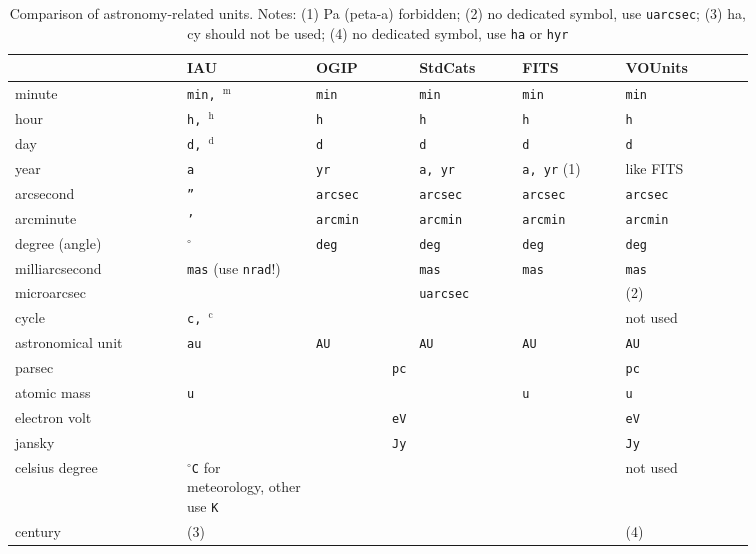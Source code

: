 \documentclass[11pt,notitlepage,onecolumn]{ivoa}
\newcommand{\unit}[1]{\texttt{\small\color{orange}#1}}
\begin{document}
\begin{table}[ht]
\begin{tabular}{|L{0.2\linewidth}|L{0.15\linewidth}|L{0.12\linewidth}|L{0.12\linewidth}|L{0.12\linewidth}|L{0.15\linewidth}|}
\hline
    & IAU & OGIP  & StdCats & FITS  & VOUnits\\\hline
    minute & \unit{min, $^\mathrm{m}$} & \unit{min} & \unit{min} & \unit{min} & \unit{min}\\\hline
    hour & \unit{h, $^\mathrm{h}$} & \unit{h} & \unit{h} & \unit{h} & \unit{h}\\\hline
    day & \unit{d, $^\mathrm{d}$} & \unit{d} & \unit{d} & \unit{d} & \unit{d}\\\hline
    year & \unit{a} & \unit{yr} & \unit{a, yr} & \unit{a, yr} (1)& like FITS\\\hline
    arcsecond & \unit{''} & \unit{arcsec} & \unit{arcsec} & \unit{arcsec} & \unit{arcsec}\\\hline
    arcminute & \unit{'} & \unit{arcmin} & \unit{arcmin} & \unit{arcmin} & \unit{arcmin}\\\hline
    degree (angle) & \unit{$^\circ$} & \unit{deg} & \unit{deg} & \unit{deg} & \unit{deg}\\\hline
    milliarcsecond & \unit{mas} (use \unit{nrad}!) &  & \unit{mas} & \unit{mas} & \unit{mas}\\\hline
    microarcsec &  &  & \unit{uarcsec} &  & (2)\\\hline
    cycle & \unit{c, $^\mathrm{c}$} &  &  &  & not used\\\hline
    astronomical unit & \unit{au} & \unit{AU} & \unit{AU} & \unit{AU} & \unit{AU}\\\hline
    parsec & \multicolumn{4}{c|}{\unit{pc}} & \unit{pc}\\\hline
    atomic mass & \unit{u} &  &  & \unit{u} & \unit{u}\\\hline
    electron volt & \multicolumn{4}{c|}{\unit{eV}} & \unit{eV}\\\hline
    jansky & \multicolumn{4}{c|}{\unit{Jy}} & \unit{Jy}\\\hline
    celsius degree & \unit{$^\circ$C} for meteorology, other use \unit{K}&  &  &  & not used\\\hline
    century & (3)&  &  &  & (4)\\\hline
\end{tabular}
  \caption[Comparison of astronomy-related units]{Comparison of astronomy-related units.
  Notes: (1) Pa (peta-a) forbidden;
  (2) no dedicated symbol, use \unit{uarcsec};
  (3) ha, cy should not be used;
  (4) no dedicated symbol, use \unit{ha} or \unit{hyr}}
  \label{tabx:comparUnitAstro}
\end{table}
\end{document}
